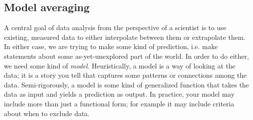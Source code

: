 % 



\subsection{Model averaging}

A central goal of data analysis from the perspective of a scientist is to use
existing, measured data to either interpolate between them or extrapolate them.
In either case, we are trying to make some kind of prediction, i.e. make
statements about some as-yet-unexplored part of the world. In order to do
either, we need some kind of {\it model}. Heuristically, a model is
a way of looking at the data; it is a story you tell that captures some patterns
or connections among the data. Semi-rigorously, a model is some kind of
generalized function that takes the data as input and yields a prediction as output.
In practice, your model may include more than just a functional form; for
example it may include criteria about when to exclude data.


